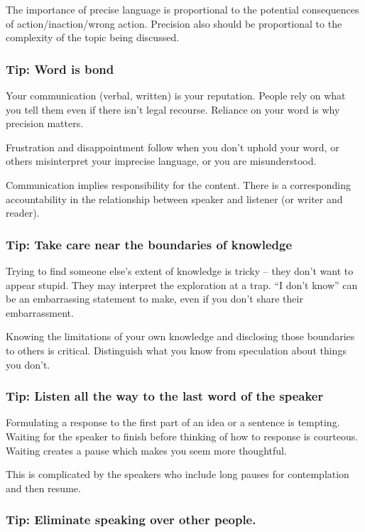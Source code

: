 The importance of precise language is proportional to the potential consequences of action/inaction/wrong action.
Precision also should be proportional to the complexity of the topic being discussed. 

\subsubsection{Tip: Word is bond\label{sec:word-is-bond}}

Your communication (verbal, written) is your reputation. People rely on what you tell them even if there isn't legal recourse. Reliance on your word is why precision matters. 

Frustration and disappointment follow when you don't uphold your word, or others misinterpret your imprecise language, or you are misunderstood.

Communication implies responsibility for the content.  There is a corresponding accountability in the relationship between speaker and listener (or writer and reader).

\subsubsection{Tip: Take care near the boundaries of knowledge}

Trying to find someone else's extent of knowledge is tricky -- they don't want to appear stupid. They may interpret the exploration at a trap. ``I don't know'' can be an embarrassing statement to make, even if you don't share their embarrassment. 

Knowing the limitations of your own knowledge and disclosing those boundaries to others is critical. Distinguish what you know from speculation about things you don't. 

\subsubsection{Tip: Listen all the way to the last word of the speaker}

Formulating a response to the first part of an idea or a sentence is tempting. Waiting for the speaker to finish before thinking of how to response is courteous. Waiting creates a pause which makes you seem more thoughtful. 

This is complicated by the speakers who include long pauses for contemplation and then resume. 

\subsubsection{Tip: Eliminate speaking over other people.\label{sec:crosstalk}}

